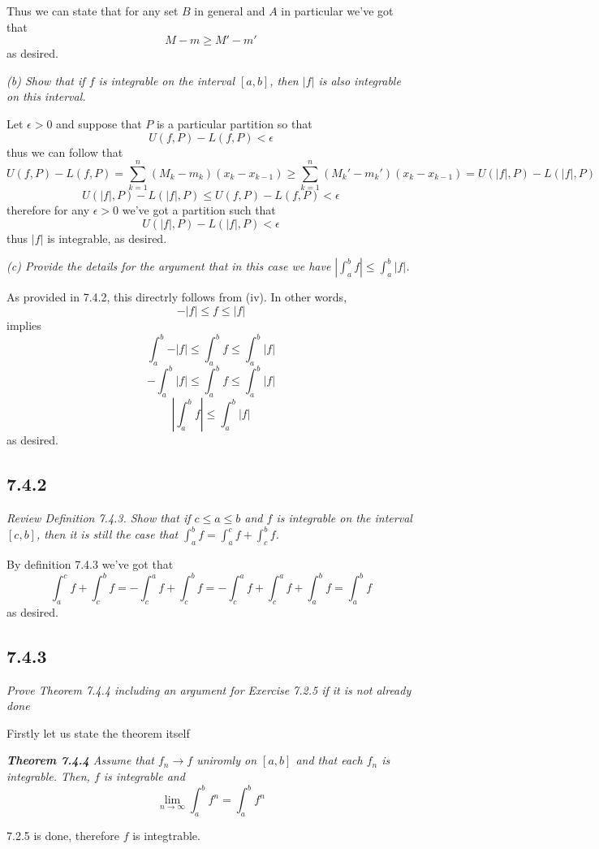 \documentclass[11pt,oneside,titlepage]{book}
\begin{document}
Thus we can state that for any set $B$  in general and $A$ in particular we've
got that 
$$M - m \geq M' - m'$$
as desired.

\textit{(b) Show that if $f$ is integrable on the interval $[a, b]$, then
  $|f|$ is also integrable on this interval.}

Let $\epsilon > 0$ and suppose that $P$ is a particular partition so that
$$U(f, P) - L(f, P) < \epsilon$$
thus we can follow that
$$U(f, P) - L(f, P) = \sum_{k = 1}^n{(M_k - m_k)(x_k - x_{k - 1})} \geq
\sum_{k = 1}^n{(M_k' - m_k')(x_k - x_{k - 1})} = U(|f|, P) - L(|f|, P)$$
$$ U(|f|, P) - L(|f|, P) \leq U(f, P) - L(f, P) < \epsilon $$
therefore for any $\epsilon > 0$ we've got a partition such that
$$ U(|f|, P) - L(|f|, P) < \epsilon $$
thus $|f|$ is integrable, as desired.

\textit{(c) Provide the details for the argument that in this case we have
  $|\int_a^b f| \leq \int_a^b{|f|}$.}

As provided in 7.4.2, this directrly follows from (iv).
In other words, 
$$-|f| \leq f \leq |f|$$
implies
$$ \int_a^b{-|f|} \leq \int_a^b{f}  \leq \int_a^b{|f|} $$
$$ - \int_a^b{|f|} \leq \int_a^b{f}  \leq \int_a^b{|f|} $$
$$|\int_a^b{f}|  \leq \int_a^b{|f|} $$
as desired.

\subsection*{7.4.2}
\textit{Review Definition 7.4.3. Show that if $c \leq a \leq b$ and
  $f$ is integrable on the interval $[c, b]$, then it is still the
  case that $\int_a^b  f = \int_a^c  f + \int_c^b  f$.}

By definition 7.4.3 we've got that 
$$\int_a^c  f + \int_c^b  f = - \int_c^a  f + \int_c^b  f =
- \int_c^a  f + \int_c^a f +  \int_a^b f= \int_a^b f $$
as desired.

\subsection*{7.4.3}
\textit{Prove Theorem 7.4.4 including an argument for Exercise 7.2.5 if it
  is not already done}

Firstly let us state the theorem itself

\textit{\textbf{Theorem 7.4.4} Assume that $f_n \to f$ uniromly on $[a, b]$
  and that each $f_n$ is integrable. Then, $f$ is integrable and}
$$\lim_{n \to \infty}{\int_a^b f^n = \int_a^b f^n}$$

7.2.5 is done, therefore $f$ is integtrable.
\end{document}
